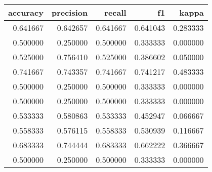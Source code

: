 \begin{tabular}{rrrrr}
\toprule
accuracy & precision & recall & f1 & kappa \\
\midrule
0.641667 & 0.642657 & 0.641667 & 0.641043 & 0.283333 \\
0.500000 & 0.250000 & 0.500000 & 0.333333 & 0.000000 \\
0.525000 & 0.756410 & 0.525000 & 0.386602 & 0.050000 \\
0.741667 & 0.743357 & 0.741667 & 0.741217 & 0.483333 \\
0.500000 & 0.250000 & 0.500000 & 0.333333 & 0.000000 \\
0.500000 & 0.250000 & 0.500000 & 0.333333 & 0.000000 \\
0.533333 & 0.580863 & 0.533333 & 0.452947 & 0.066667 \\
0.558333 & 0.576115 & 0.558333 & 0.530939 & 0.116667 \\
0.683333 & 0.744444 & 0.683333 & 0.662222 & 0.366667 \\
0.500000 & 0.250000 & 0.500000 & 0.333333 & 0.000000 \\
\bottomrule
\end{tabular}
